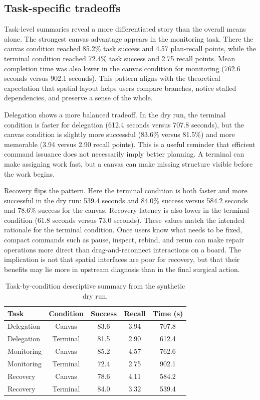 \documentclass[sigconf]{acmart}
\begin{document}
\subsection{Task-specific tradeoffs}

Task-level summaries reveal a more differentiated story than the overall means alone. The strongest canvas advantage appears in the monitoring task. There the canvas condition reached 85.2\% task success and 4.57 plan-recall points, while the terminal condition reached 72.4\% task success and 2.75 recall points. Mean completion time was also lower in the canvas condition for monitoring (762.6 seconds versus 902.1 seconds). This pattern aligns with the theoretical expectation that spatial layout helps users compare branches, notice stalled dependencies, and preserve a sense of the whole.

Delegation shows a more balanced tradeoff. In the dry run, the terminal condition is faster for delegation (612.4 seconds versus 707.8 seconds), but the canvas condition is slightly more successful (83.6\% versus 81.5\%) and more memorable (3.94 versus 2.90 recall points). This is a useful reminder that efficient command issuance does not necessarily imply better planning. A terminal can make assigning work fast, but a canvas can make missing structure visible before the work begins.

Recovery flips the pattern. Here the terminal condition is both faster and more successful in the dry run: 539.4 seconds and 84.0\% success versus 584.2 seconds and 78.6\% success for the canvas. Recovery latency is also lower in the terminal condition (61.8 seconds versus 73.0 seconds). These values match the intended rationale for the terminal condition. Once users know what needs to be fixed, compact commands such as pause, inspect, rebind, and rerun can make repair operations more direct than drag-and-reconnect interactions on a board. The implication is not that spatial interfaces are poor for recovery, but that their benefits may lie more in upstream diagnosis than in the final surgical action.

\begin{table}[t]
\caption{Task-by-condition descriptive summary from the synthetic dry run.}
\label{tab:task}
\begin{tabular}{lcccc}
\hline
Task & Condition & Success & Recall & Time (s) \\
\hline
Delegation & Canvas & 83.6 & 3.94 & 707.8 \\
Delegation & Terminal & 81.5 & 2.90 & 612.4 \\
Monitoring & Canvas & 85.2 & 4.57 & 762.6 \\
Monitoring & Terminal & 72.4 & 2.75 & 902.1 \\
Recovery & Canvas & 78.6 & 4.11 & 584.2 \\
Recovery & Terminal & 84.0 & 3.32 & 539.4 \\
\hline
\end{tabular}
\end{table}
\end{document}
